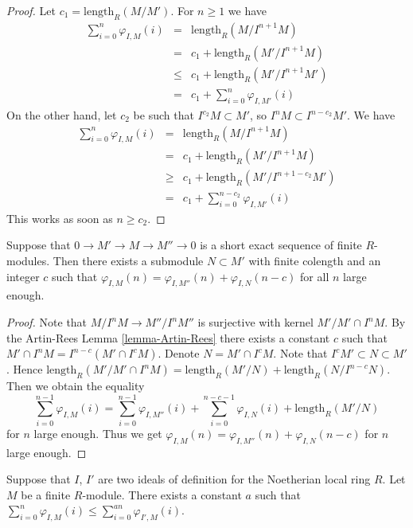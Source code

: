 \begin{proof}
Let $c_1 = \text{length}_R(M/M')$. For $n \geq 1$ we have
\begin{eqnarray*}
\sum\nolimits_{i = 0}^n \varphi_{I, M}(i)
& = &
\text{length}_R(M/I^{n + 1}M) \\
& = &
c_1 + \text{length}_R(M'/I^{n + 1}M) \\
& \leq &
c_1 + \text{length}_R(M'/I^{n + 1}M') \\
& = &
c_1 + \sum\nolimits_{i = 0}^n \varphi_{I, M'}(i)
\end{eqnarray*}
On the other hand, let $c_2$ be such that $I^{c_2}M \subset M'$,
so $I^nM \subset I^{n - c_2}M'$. We have
\begin{eqnarray*}
\sum\nolimits_{i = 0}^n \varphi_{I, M}(i)
& = &
\text{length}_R(M/I^{n + 1}M) \\
& = &
c_1 + \text{length}_R(M'/I^{n + 1}M) \\
& \geq &
c_1 + \text{length}_R(M'/I^{n + 1 - c_2}M') \\
& = &
c_1 + \sum\nolimits_{i = 0}^{n - c_2} \varphi_{I, M'}(i)
\end{eqnarray*}
This works as soon as $n \geq c_2$.
\end{proof}

\begin{lemma}
\label{lemma-hilbert-ses}
Suppose that $0 \to M' \to M \to M'' \to 0$
is a short exact sequence of finite $R$-modules.
Then there exists a submodule $N \subset M'$ with
finite colength and an integer $c$ such that $\varphi_{I,M}(n)
= \varphi_{I, M''}(n) + \varphi_{I,N}(n-c)$ for all $n$ large enough.
\end{lemma}

\begin{proof}
Note that $M/I^nM \to M''/I^nM''$ is surjective
with kernel $M' / M' \cap I^nM$. By the Artin-Rees
Lemma \ref{lemma-Artin-Rees} there exists a
constant $c$ such that $M' \cap I^nM =
I^{n-c}(M' \cap I^cM)$. Denote $N = M' \cap I^cM$.
Note that $I^c M' \subset N \subset M'$.
Hence $\text{length}_R(M' / M' \cap I^nM) 
= \text{length}_R(M'/N) + \text{length}_R(N/I^{n-c}N)$.
Then we obtain the equality
$$
\sum_{i=0}^{n-1} \varphi_{I,M}(i)
=
\sum_{i=0}^{n-1} \varphi_{I,M''}(i)
+
\sum_{i=0}^{n-c-1} \varphi_{I,N}(i)
+
\text{length}_R(M'/N)
$$
for $n$ large enough. Thus we get $\varphi_{I,M}(n)
= \varphi_{I, M''}(n) + \varphi_{I,N}(n-c)$ for
$n$ large enough.
\end{proof}

\begin{lemma}
\label{lemma-hilbert-change-I}
Suppose that $I$, $I'$ are two ideals of definition
for the Noetherian local ring $R$. Let $M$ be a
finite $R$-module. There exists a constant $a$ such that
$
\sum_{i = 0}^n \varphi_{I,M}(i) \leq
\sum_{i = 0}^{an}\varphi_{I',M}(i)$.
\end{lemma}

